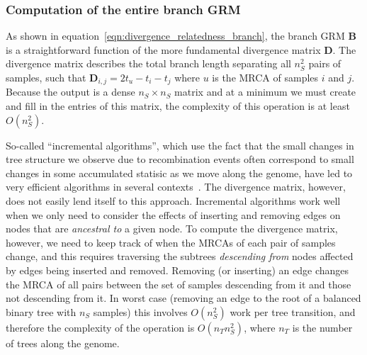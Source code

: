 \subsubsection{Computation of the entire branch GRM}

As shown in equation~\eqref{eqn:divergence_relatedness_branch},
the branch GRM $\mathbf{B}$ is a 
straightforward function of the more fundamental divergence matrix $\mathbf{D}$.
The divergence matrix describes
the total branch length separating all $n_S^2$ pairs of samples, such 
that $\mathbf{D}_{i,j} = 2t_u - t_i - t_j$ where $u$ is the MRCA of samples $i$ and $j$.
Because the output is a dense $n_S \times n_S$ matrix 
and at a minimum we must create and fill in the entries of this matrix,
the complexity of this operation is at least $O(n_S^2)$.

So-called ``incremental algorithms'', which use the fact that the 
small changes in tree structure we observe due to recombination events
often correspond to small changes in some accumulated statisic as 
we move along the genome,
have led to very efficient algorithms in several 
contexts~\citep{kelleher2016efficient,ralph2020efficiently,kelleher2020coalescent}. 
The divergence matrix, however, does not easily lend itself to this approach.
Incremental algorithms work well when we only need to consider the effects 
of inserting and removing edges on nodes that are \emph{ancestral to}
a given node. To compute the divergence matrix, however, we need to keep track
of when the MRCAs of each pair of samples change, and this requires 
traversing the subtrees \emph{descending from} nodes affected by 
edges being inserted and removed. Removing (or inserting) an edge changes the MRCA of 
all pairs between the set of samples descending from it 
and those not descending from it. In worst case (removing an edge to the 
root of a balanced binary tree with $n_S$ samples) this involves 
$O(n_S^2)$ work per tree transition, and therefore the complexity of the 
operation is $O(n_T n_S^2)$, where $n_T$ 
is the number of trees along the genome.

